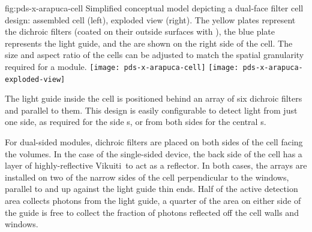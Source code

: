  \begin{dunefigure}{fig:pds-x-arapuca-cell}
{Simplified conceptual model depicting a 
dual-face filter   cell design: assembled cell (left),  exploded view (right). The yellow plates represent the dichroic filters (coated on their outside surfaces with ), the blue plate represents the light guide, and the  are shown on the right side of the cell. The size and aspect ratio of the cells can be adjusted to match the spatial granularity required for a  module. 
} 
  \texttt{[image: pds-x-arapuca-cell]}
  \texttt{[image: pds-x-arapuca-exploded-view]}
\end{dunefigure}
The light guide inside the cell is positioned behind an array of six dichroic filters and parallel to them. 
This design is easily configurable to detect light from just one side, as required for the side s, or from both sides for the central s. 

For dual-sided  modules, dichroic filters are placed on both sides of the %
cell facing the \lar volumes.  In the case of the single-sided device, the back side of the cell  %
has a layer of highly-reflective Vikuiti\texttrademark\ to act as %
a  reflector.  In both cases, the  arrays are installed on two of the narrow sides of the cell perpendicular to the windows, parallel to and up against the light guide thin ends. Half of the  active detection area collects photons from the light guide, a quarter of the area on either side of the guide is free to collect the fraction of photons reflected off the cell walls and windows. 

